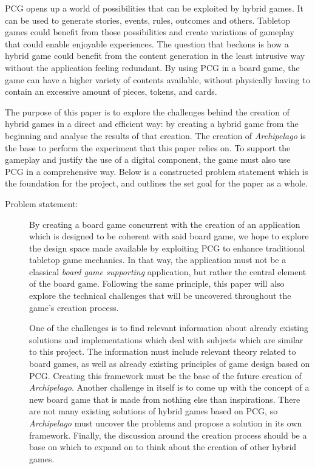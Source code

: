 PCG opens up a world of possibilities that can be exploited by hybrid games. It can be used to generate stories, events, rules, outcomes and others. Tabletop games could benefit from those possibilities and create variations of gameplay that could enable enjoyable experiences. The question that beckons is how a hybrid game could benefit from the content generation in the least intrusive way without the application feeling redundant. By using PCG in a board game, the game can have a higher variety of contents available, without physically having to contain an excessive amount of pieces, tokens, and cards. 

The purpose of this paper is to explore the challenges behind the creation of hybrid games in a direct and efficient way: by creating a hybrid game from the beginning and analyse the results of that creation. The creation of \textit{Archipelago} is the base to perform the experiment that this paper relies on. To support the gameplay and justify the use of a digital component, the game must also use PCG in a comprehensive way. Below is a constructed problem statement which is the foundation for the project, and outlines the set goal for the paper as a whole.

\begin{description}
\item[Problem statement:]

By creating a board game concurrent with the creation of an application which is designed to be coherent with said board game, we hope to explore the design space made available by exploiting PCG to enhance traditional tabletop game mechanics. In that way, the application must not be a classical \textit{board game supporting} application, but rather the central element of the board game. Following the same principle, this paper will also explore the technical challenges that will be uncovered throughout the game's creation process. 

One of the challenges is to find relevant information about already existing solutions and implementations which deal with subjects which are similar to this project. The information must include relevant theory related to board games, as well as already existing principles of game design based on PCG. Creating this framework must be the base of the future creation of \textit{Archipelago}. Another challenge in itself is to come up with the concept of a new board game that is made from nothing else than inspirations. There are not many existing solutions of hybrid games based on PCG, so \textit{Archipelago} must uncover the problems and propose a solution in its own framework. Finally, the discussion around the creation process should be a base on which to expand on to think about the creation of other hybrid games. 
\end{description}

